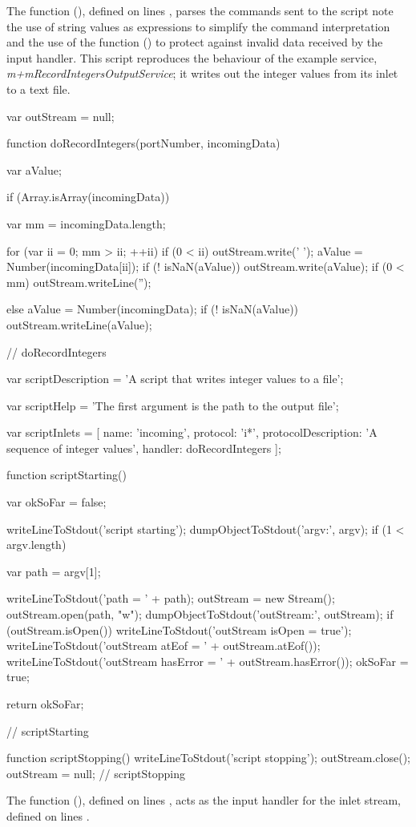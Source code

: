 The function (), defined on lines \longDash{}, parses
the commands sent to the script \longDash{} note the use of string values as 
expressions to simplify the command interpretation and the use of the function
() to protect against invalid data received by the input handler.
\secondaryEnd
\condPage
{}
This script reproduces the behaviour of the example service,
\emph{m+mRecordIntegersOutputService}; it writes out the integer values from its inlet to
a text file.
\codeBegin
\begin{listing}[5]{1}
var outStream = null;

function doRecordIntegers(portNumber, incomingData)
{
    var aValue;
    
    if (Array.isArray(incomingData))
    {
        var mm = incomingData.length;
        
        for (var ii = 0; mm > ii; ++ii)
        {
            if (0 < ii)
            {
                outStream.write(' ');
            }
            aValue = Number(incomingData[ii]);
            if (! isNaN(aValue))
            {
                outStream.write(aValue);
            }
        }
        if (0 < mm)
        {
            outStream.writeLine('');
        }
    }
    else
    {
        aValue = Number(incomingData);
        if (! isNaN(aValue))
        {
            outStream.writeLine(aValue);
        }
    }
} // doRecordIntegers

var scriptDescription = 'A script that writes integer values to a file';

var scriptHelp = 'The first argument is the path to the output file';

var scriptInlets = [ { name: 'incoming', protocol: 'i*',
                        protocolDescription: 'A sequence of integer values',
                        handler: doRecordIntegers } ];

function scriptStarting()
{
    var okSoFar = false;
    
    writeLineToStdout('script starting');
    dumpObjectToStdout('argv:', argv);
    if (1 < argv.length)
    {
        var path = argv[1];
        
        writeLineToStdout('path = ' + path);
        outStream = new Stream();
        outStream.open(path, "w");
        dumpObjectToStdout('outStream:', outStream);
        if (outStream.isOpen())
        {
            writeLineToStdout('outStream isOpen = true');
            writeLineToStdout('outStream atEof = ' + outStream.atEof());
            writeLineToStdout('outStream hasError = ' + outStream.hasError());
        }
        okSoFar = true;
    }
    return okSoFar;
} // scriptStarting

function scriptStopping()
{
    writeLineToStdout('script stopping');
    outStream.close();
    outStream = null;
} // scriptStopping
\end{listing}
\codeEnd{}
The function (), defined on lines \longDash{},
acts as the input handler for the inlet stream, defined on lines
\longDash{}.\\

